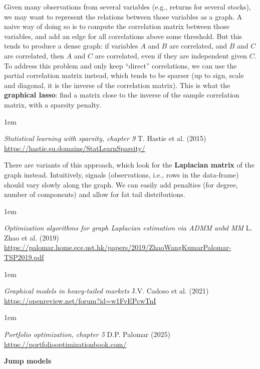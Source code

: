 \documentclass[a5paper]{article}
\let\d\textbf
\newenvironment{reference}{%
  \medskip\goodbreak
  \parskip 0pt
  \raggedright
  \leftskip 1em
  \obeylines
}{\par\medskip\goodbreak}
\def\subsection#1{{\par\bigskip\goodbreak\large\bfseries #1\par}}
\begin{document}
Given many observations from several variables (e.g., returns for several stocks),
we may want to represent the relations between those variables
as a graph.
A naive way of doing so is to compute the correlation matrix between those variables,
and add an edge for all correlations above some threshold.
But this tends to produce a dense graph:
if variables $A$ and $B$ are correlated, and $B$ and $C$ are correlated, then
$A$ and $C$ are correlated, even if they are independent given $C$.
To address this problem and only keep ``direct'' correlations,
we can use the partial correlation matrix instead, which tends to be sparser
(up to sign, scale and diagonal, it is the inverse of the correlation matrix).
This is what the \d{graphical lasso}:
find a matrix close to the inverse of the sample correlation matrix,
with a sparsity penalty.

\begin{reference}
  \emph{Statistical learning with sparsity, chapter 9}
  T. Hastie et al. (2015)
  \url{https://hastie.su.domains/StatLearnSparsity/}
\end{reference}

There are variants of this approach, which look for the \d{Laplacian matrix} of the graph instead.
Intuitively, signals (observations, i.e., rows in the data-frame)
should vary slowly along the graph.
We can easily add penalties (for degree, number of components)
and allow for fat tail distributions.

\begin{reference}
  \emph{Optimization algorithms for graph Laplacian estimation via ADMM anbd MM}
  L. Zhao et al. (2019)
  \url{https://palomar.home.ece.ust.hk/papers/2019/ZhaoWangKumarPalomar-TSP2019.pdf}
\end{reference}

\begin{reference}
  \emph{Graphical models in heavy-tailed markets}
  J.V. Cadoso et al. (2021)
  \url{https://openreview.net/forum?id=w1FvEPcwTnI}
\end{reference}

\begin{reference}
  \emph{Portfolio optimization, chapter 5}
  D.P. Palomar (2025)
  \url{https://portfoliooptimizationbook.com/}
\end{reference}

\subsection{Jump models}
\end{document}
